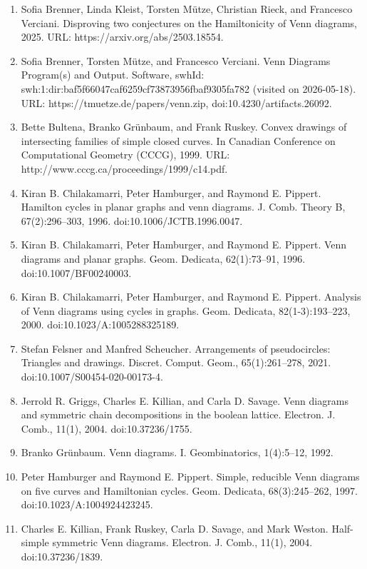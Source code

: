 \begin{enumerate}
\item[]  [1]  Sofia Brenner, Linda Kleist, Torsten Mütze, Christian Rieck, and Francesco Verciani.  Disproving two conjectures on the Hamiltonicity of Venn diagrams, 2025.  URL: https://arxiv.org/abs/2503.18554.  
\item[]  [2]  Sofia Brenner, Torsten Mütze, and Francesco Verciani.  Venn Diagrams Program(s) and Output.  Software, swhId: swh:1:dir:baf5f66047caf6259cf73873956fbaf9305fa782 (visited on 2026-05-18).  URL: https://tmuetze.de/papers/venn.zip, doi:10.4230/artifacts.26092.  
\item[]  [3]  Bette Bultena, Branko Grünbaum, and Frank Ruskey.  Convex drawings of intersecting families of simple closed curves.  In Canadian Conference on Computational Geometry (CCCG), 1999.  URL: http://www.cccg.ca/proceedings/1999/c14.pdf.  
\item[]  [4]  Kiran B. Chilakamarri, Peter Hamburger, and Raymond E. Pippert.  Hamilton cycles in planar graphs and venn diagrams.  J. Comb. Theory B, 67(2):296–303, 1996.  doi:10.1006/JCTB.1996.0047.  
\item[]  [5]  Kiran B. Chilakamarri, Peter Hamburger, and Raymond E. Pippert.  Venn diagrams and planar graphs.  Geom. Dedicata, 62(1):73–91, 1996.  doi:10.1007/BF00240003.  
\item[]  [6]  Kiran B. Chilakamarri, Peter Hamburger, and Raymond E. Pippert.  Analysis of Venn diagrams using cycles in graphs.  Geom. Dedicata, 82(1-3):193–223, 2000.  doi:10.1023/A:1005288325189.  
\item[]  [7]  Stefan Felsner and Manfred Scheucher.  Arrangements of pseudocircles: Triangles and drawings.  Discret. Comput. Geom., 65(1):261–278, 2021.  doi:10.1007/S00454-020-00173-4.  
\item[]  [8]  Jerrold R. Griggs, Charles E. Killian, and Carla D. Savage.  Venn diagrams and symmetric chain decompositions in the boolean lattice.  Electron. J. Comb., 11(1), 2004.  doi:10.37236/1755.  
\item[]  [9]  Branko Grünbaum.  Venn diagrams. I.  Geombinatorics, 1(4):5–12, 1992.  
\item[]  [10]  Peter Hamburger and Raymond E. Pippert.  Simple, reducible Venn diagrams on five curves and Hamiltonian cycles.  Geom. Dedicata, 68(3):245–262, 1997.  doi:10.1023/A:1004924423245.  
\item[]  [11]  Charles E. Killian, Frank Ruskey, Carla D. Savage, and Mark Weston.  Half-simple symmetric Venn diagrams.  Electron. J. Comb., 11(1), 2004.  doi:10.37236/1839.  

\end{enumerate}
